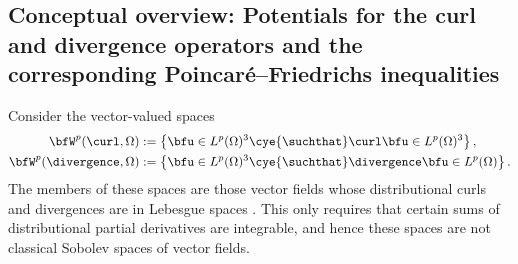\subsection{Conceptual overview: Potentials for the curl and divergence operators and the corresponding Poincar\'e--Friedrichs inequalities} \label{section:intro_curl_div}

Consider the vector-valued spaces
\begin{align}\label{equation:W_curl_div_p} 
    \bfW^{p}(\curl,\Omega) &:= \left\{ \bfu \in L^{p}(\Omega)^{3} \cye{\suchthat} \curl \bfu \in L^{p}(\Omega)^{3} \right\}
    ,
    \\
    \bfW^{p}(\divergence,\Omega) &:= \left\{ \bfu \in L^{p}(\Omega)^{3} \cye{\suchthat} \divergence \bfu \in L^{p}(\Omega) \right\}
    .
\end{align}
The members of these spaces are those vector fields whose distributional curls and divergences are  in  Lebesgue spaces .  
This only requires that certain sums of distributional partial derivatives are integrable, 
and hence these spaces are not classical Sobolev spaces of vector  fields. 

